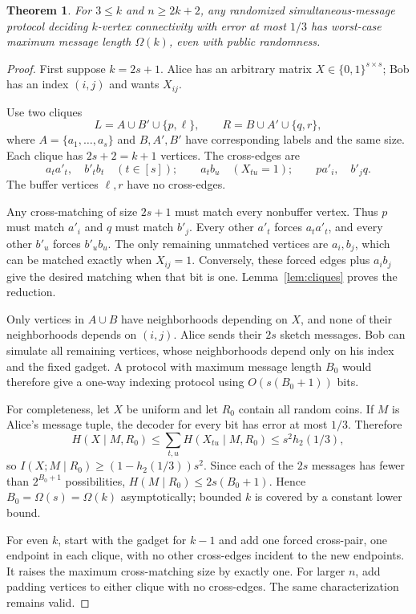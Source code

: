 \documentclass[11pt]{article}
\newtheorem{theorem}{Theorem}[section]
\theoremstyle{remark}\newtheorem{remark}[theorem]{Remark}
\begin{document}
\begin{theorem}\label{thm:index}
For $3\le k$ and $n\ge2k+2$, any randomized simultaneous-message protocol deciding $k$-vertex connectivity with error at most $1/3$ has worst-case maximum message length $\Omega(k)$, even with public randomness.
\end{theorem}
\begin{proof}
First suppose $k=2s+1$. Alice has an arbitrary matrix $X\in\{0,1\}^{s\times s}$; Bob has an index $(i,j)$ and wants $X_{ij}$.

Use two cliques
\[
 L=A\cup B'\cup\{p,\ell\},\qquad
 R=B\cup A'\cup\{q,r\},
\]
where $A=\{a_1,\ldots,a_s\}$ and $B,A',B'$ have corresponding labels and the same size. Each clique has $2s+2=k+1$ vertices. The cross-edges are
\[
 a_ta'_t,\quad b'_tb_t\quad(t\in[s]);\qquad
 a_tb_u\quad(X_{tu}=1);\qquad
 pa'_i,\quad b'_jq.
\]
The buffer vertices $\ell,r$ have no cross-edges.

Any cross-matching of size $2s+1$ must match every nonbuffer vertex. Thus $p$ must match $a'_i$ and $q$ must match $b'_j$. Every other $a'_t$ forces $a_ta'_t$, and every other $b'_u$ forces $b'_ub_u$. The only remaining unmatched vertices are $a_i,b_j$, which can be matched exactly when $X_{ij}=1$. Conversely, these forced edges plus $a_ib_j$ give the desired matching when that bit is one. Lemma~\ref{lem:cliques} proves the reduction.

Only vertices in $A\cup B$ have neighborhoods depending on $X$, and none of their neighborhoods depends on $(i,j)$. Alice sends their $2s$ sketch messages. Bob can simulate all remaining vertices, whose neighborhoods depend only on his index and the fixed gadget. A protocol with maximum message length $B_0$ would therefore give a one-way indexing protocol using $O(s(B_0+1))$ bits.

For completeness, let $X$ be uniform and let $R_0$ contain all random coins. If $M$ is Alice's message tuple, the decoder for every bit has error at most $1/3$. Therefore
\[
 H(X\mid M,R_0)\le \sum_{t,u} H(X_{tu}\mid M,R_0)
 \le s^2 h_2(1/3),
\]
so $I(X;M\mid R_0)\ge(1-h_2(1/3))s^2$. Since each of the $2s$ messages has fewer than $2^{B_0+1}$ possibilities, $H(M\mid R_0)\le2s(B_0+1)$. Hence $B_0=\Omega(s)=\Omega(k)$ asymptotically; bounded $k$ is covered by a constant lower bound.

For even $k$, start with the gadget for $k-1$ and add one forced cross-pair, one endpoint in each clique, with no other cross-edges incident to the new endpoints. It raises the maximum cross-matching size by exactly one. For larger $n$, add padding vertices to either clique with no cross-edges. The same characterization remains valid.
\end{proof}
\end{document}
